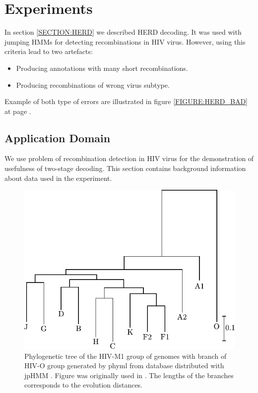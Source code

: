 \section{Experiments}

In section \ref{SECTION:HERD} we described HERD decoding. It was used with
jumping HMMs \cite{Schultz2006} for detecting recombinations in HIV virus.
However, using this criteria lead to two artefacts: 
\begin{itemize}[itemsep=-1mm]
\item Producing annotations with many short recombinations.  
\item Producing recombinations of wrong virus subtype.  
\end{itemize}
Example of both type of
errors are illustrated in figure \ref{FIGURE:HERD_BAD} at page
\pageref{FIGURE:HERD_BAD}.

\subsection{Application Domain}
We use problem of recombination detection in HIV virus for the demonstration of
usefulness of two-stage decoding.  This section contains background information
about data used in the experiment.

\begin{figure}
\begin{center}
\includegraphics{../figures/hiv_M1strom}
\end{center}
\caption[Phylogenetic tree of the HIV-M1 group]{Phylogenetic tree of the HIV-M1
group of genomes with branch of HIV-O group generated by phyml \cite{Guidon2003}
from database distributed with jpHMM \cite{Schultz2006}. Figure was originally
used in \cite{Nanasi2010mgr}. The lengths of the branches corresponds to the
evolution distances.  }\label{app:figure:phil}
\end{figure}

